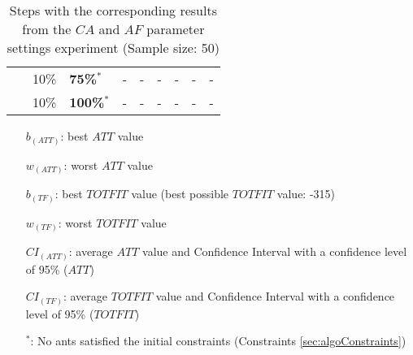 \begin{sidewaystable}
\begin{tabular}{|l|l|l||c|c|c|c|c|c|}
    ~ & 10\% &\textbf{75\%$^*$} & - & - & - & - & - & - \\
    ~ & 10\% &\textbf{100\%$^*$} & - & - & - & - & - & - \\
    \hline
    \end{tabular}
    \caption {Steps with the corresponding results from the $CA$ and $AF$ parameter settings experiment (Sample size: 50)}
    \tiny
    \begin{itemize}[noitemsep]
    \item[$b_{(ATT)}$:] best $ATT$ value
    \item[$w_{(ATT)}$:] worst $ATT$ value
    \item[$b_{(TF)}$:] best $TOTFIT$ value (best possible $TOTFIT$ value: -315)
    \item[$w_{(TF)}$:] worst $TOTFIT$ value
    \item[$CI_{(ATT)}$:] average $ATT$ value and Confidence Interval with a confidence level of 95\% ($ATT$)
    \item[$CI_{(TF)}$:] average $TOTFIT$ value and Confidence Interval with a confidence level of 95\% ($TOTFIT$)
    \item[$^*$:] No ants satisfied the initial constraints (Constraints \vref{sec:algoConstraints})
    \end{itemize}
    \label{table:pm2}
\end{sidewaystable}


